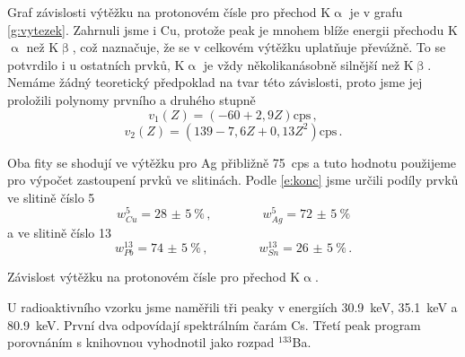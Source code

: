 Graf závislosti výtěžku na protonovém čísle pro přechod K$\upalpha$ je v grafu \ref{g:vytezek}. Zahrnuli jsme i Cu, protože peak je mnohem blíže energii přechodu K$\upalpha$ než K$\upbeta$, což naznačuje, že se v celkovém výtěžku uplatňuje převážně. To se potvrdilo i u ostatních prvků, K$\upalpha$ je vždy několikanásobně silnější než K$\upbeta$.
Nemáme žádný teoretický předpoklad na tvar této závislosti, proto jsme jej proložili polynomy prvního a druhého stupně
\begin{equation}
v_1(Z)=(-60+2,9Z)\text{cps} \,,
\end{equation}
\begin{equation}
v_2(Z)=(139-7,6Z+0,13Z^2)\text{cps} \,.
\end{equation}

Oba fity se shodují ve výtěžku pro Ag přibližně \SI{75}{cps} a tuto hodnotu použijeme pro výpočet zastoupení prvků ve slitinách.
Podle \eqref{e:konc} jsme určili podíly prvků ve slitině číslo 5
\begin{equation}
w_{Cu}^5=\SI{28(5)}{\percent} \,,\qquad \qquad w_{Ag}^5=\SI{72(5)}{\percent}
\end{equation}
a ve slitině číslo 13
\begin{equation}
w_{Pb}^{13}=\SI{74(5)}{\percent} \,,\qquad \qquad w_{Sn}^{13}=\SI{26(5)}{\percent} \,.
\end{equation}

\begin{graph}[htbp] 
\centering

\caption{Závislost výtěžku na protonovém čísle pro přechod K$\upalpha$.}
\label{g:vytezek}
\end{graph}

U radioaktivního vzorku jsme naměřili tři peaky v energiích \SI{30.9}{\keV}, \SI{35.1}{\keV} a \SI{80.9}{\keV}. První dva odpovídají spektrálním čarám Cs. Třetí peak program porovnáním s knihovnou vyhodnotil jako rozpad $^{133}$Ba.